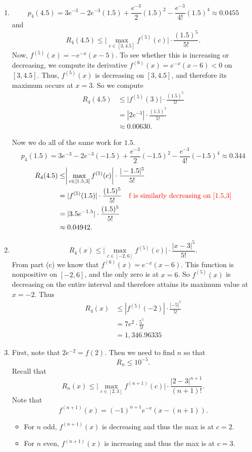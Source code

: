 \documentclass[]{ximera}
\begin{document}
\begin{problem}
\begin{freeResponse}
\begin{enumerate}
	\item  
		\[
		p_4(4.5) = 3e^{-3} - 2e^{-3}(1.5) + \frac{e^{-3}}{2}(1.5)^2 - \frac{e^{-3}}{4!}(1.5)^4 \approx 0.0455
		\]
	and
		\[
		R_4(4.5) \leq \biggr| \max_{c \in [3,4.5]} f^{(5)}(c) \biggr| \cdot \frac{(1.5)^5}{5!}.
		\]
	Now, $f^{(5)}(x) = -e^{-x}(x-5)$.  
	To see whether this is increasing or decreasing, we compute its derivative $f^{(6)}(x) = e^{-x}(x-6) < 0$ on $[3,4.5]$.  
	Thus, $f^{(5)}(x)$ is decreasing on $[3,4.5]$, and therefore its maximum occurs at $x=3$.  
	So we compute
		\begin{align*}
		R_4(4.5) &\leq \biggr| f^{(5)}(3) \biggr| \cdot \frac{(1.5)^5}{5!}  \\
		&= |2e^{-3}| \cdot \frac{(1.5)^5}{5!}  \\
		&\approx 0.00630.
		\end{align*}
		
	Now we do all of the same work for $1.5$.  
		\[
		p_4(1.5) = 3e^{-3} - 2e^{-3}(-1.5) + \frac{e^{-3}}{2}(-1.5)^2 - \frac{e^{-3}}{4!}(-1.5)^4 \approx 0.344
		\]
		\begin{align*}
		R_4(4.5) &\leq \biggr| \max_{c \in [1.5,3]} f^{(5)}(c) \biggr| \cdot \frac{|-1.5|^5}{5!} \\
		&= | f^{(5)}(1.5) | \cdot \frac{(1.5)^5}{5!}  \quad {\color{red}\text{f is similarly decreasing on [1.5,3]}}\\
		&= | 3.5 e^{-1.5} |  \cdot \frac{(1.5)^5}{5!}  \\
		&\approx 0.04942.
		\end{align*}
	
	\item  
		\[
		R_4(x) \leq \biggr| \max_{c \in [-2,6]} f^{(5)}(c) \biggr| \cdot \frac{|x-3|^5}{5!}.
		\]
	From part (c) we know that $f^{(6)}(x) = e^{-x}(x-6)$.  
	This function is nonpositive on $[-2,6]$, and the only zero is at $x=6$.  
	So $f^{(5)}(x)$ is decreasing on the entire interval and therefore attains its maximum value at $x=-2$.  
	Thus
		\begin{align*}
		R_4(x) &\leq |f^{(5)}(-2)| \cdot \frac{|-5|^5}{5!}  \\
		&= 7e^2 \cdot \frac{5^5}{5!}  \\
		&= 1,346.96335
		\end{align*}
	
	\item  First, note that $2e^{-2} = f(2)$.  
	Then we need to find $n$ so that
		\[
		R_n \leq 10^{-5}.
		\]
	Recall that
		\[
		R_n(x) \leq \biggr| \max_{c \in [2,3]} f^{(n+1)}(c) \biggr| \cdot \frac{|2-3|^{n+1}}{(n+1)!}.
		\]
	Note that
		\[
		f^{(n+1)}(x) = (-1)^{n+1} e^{-x} (x - (n+1)).
		\]
	\begin{itemize}
	\item For $n$ odd, $f^{(n+1)}(x)$ is decreasing and thus the max is at $c=2$.
	\item For $n$ even, $f^{(n+1)}(x)$ is increasing and thus the max is at $c=3$.  
	\end{itemize}
	

\end{enumerate}
\end{freeResponse}
\end{problem}
\end{document}
